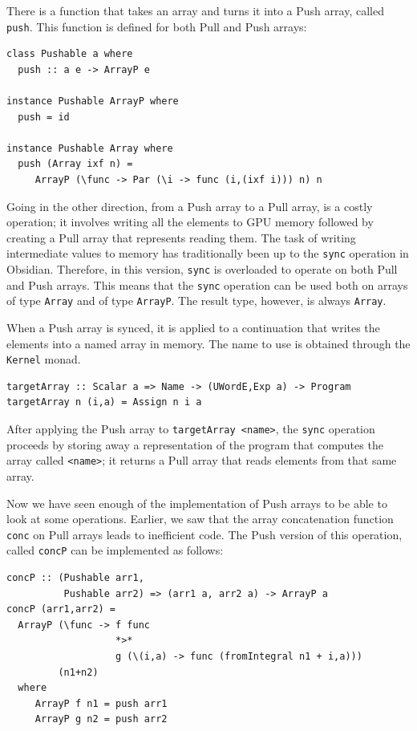 \documentclass[]{sigplanconf}
\begin{document}
There is a function that takes an array and turns it into a Push array, 
called {\tt push}. This function is defined for both Pull and Push arrays: 

\begin{codesize}
\begin{verbatim} 
class Pushable a where 
  push :: a e -> ArrayP e 

instance Pushable ArrayP where 
  push = id 
  
instance Pushable Array where   
  push (Array ixf n) =
     ArrayP (\func -> Par (\i -> func (i,(ixf i))) n) n 
\end{verbatim}
\end{codesize}

Going in the other direction, from a Push array to a Pull array, is a 
costly operation; it involves writing all the elements to GPU memory 
followed by creating a Pull array that represents reading them. 
The task of writing intermediate values to memory 
has traditionally been up to the {\tt sync} operation in Obsidian.
Therefore, in this version, {\tt sync} is overloaded to operate on both Pull and 
Push arrays.  This means that the 
{\tt sync} operation can be used both on arrays of type {\tt Array} 
and of type {\tt ArrayP}. The result type, however, is always {\tt Array}. 

When a Push array is synced, it is applied to a continuation that writes the
elements into a named array in memory. The name to use is obtained through the 
{\tt Kernel} monad.  

\begin{codesize}
\begin{verbatim}
targetArray :: Scalar a => Name -> (UWordE,Exp a) -> Program
targetArray n (i,a) = Assign n i a 
\end{verbatim}
\end{codesize}

After applying the Push array to {\tt targetArray <name>}, the {\tt sync}
operation proceeds by storing away a representation of the program that 
computes the array called {\tt <name>}; it returns a Pull array 
that reads elements from that same array. 

Now we have seen enough of the implementation of Push arrays to be able 
to look at some operations. Earlier, we saw that the
array concatenation function
{\tt conc} on Pull arrays leads to inefficient code. The Push 
version of this operation, called {\tt concP} can be implemented 
as follows: 

\begin{codesize}
\begin{verbatim}
concP :: (Pushable arr1,
          Pushable arr2) => (arr1 a, arr2 a) -> ArrayP a     
concP (arr1,arr2) = 
  ArrayP (\func -> f func
                   *>* 
                   g (\(i,a) -> func (fromIntegral n1 + i,a)))
         (n1+n2)
  where 
     ArrayP f n1 = push arr1
     ArrayP g n2 = push arr2
\end{verbatim}
\end{codesize}
\end{document}
